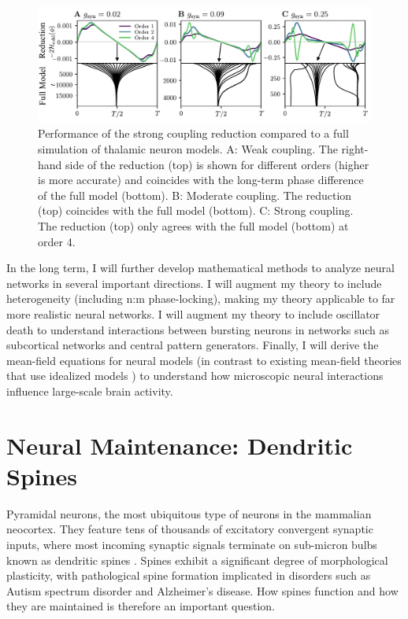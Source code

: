 \documentclass[a4paper,11pt]{article}
\begin{document}
\begin{figure}[ht!]
	\centering
	\includegraphics[width=\textwidth]{figures/thal_h_edited.pdf}
	\caption{Performance of the strong coupling reduction compared to a full simulation of thalamic neuron models. A: Weak coupling. The right-hand side of the reduction (top) is shown for different orders (higher is more accurate) and coincides with the long-term phase difference of the full model (bottom). B: Moderate coupling. The reduction (top) coincides with the full model (bottom). C: Strong coupling. The reduction (top) only agrees with the full model (bottom) at order 4. }\label{fig:thal}
\end{figure}

In the long term, I will further develop mathematical methods to analyze neural networks in several important directions. I will augment my theory to include heterogeneity (including n:m phase-locking), making my theory applicable to far more realistic neural networks. I will augment my theory to include oscillator death to understand interactions between bursting neurons in networks such as subcortical networks and central pattern generators. Finally, I will derive the mean-field equations for neural models (in contrast to existing mean-field theories that use idealized models \cite{ott2008low}) to understand how microscopic neural interactions influence large-scale brain activity.

\section{Neural Maintenance: Dendritic Spines} \label{sec:maintenance}

Pyramidal neurons, the most ubiquitous type of neurons in the mammalian neocortex. They feature tens of thousands of excitatory convergent synaptic inputs, where most incoming synaptic signals terminate on sub-micron bulbs known as dendritic spines \cite{nimchinsky2002structure}. Spines exhibit a significant degree of morphological plasticity, with pathological spine formation implicated in disorders such as Autism spectrum disorder and Alzheimer's disease. How spines function and how they are maintained is therefore an important question.
\end{document}
